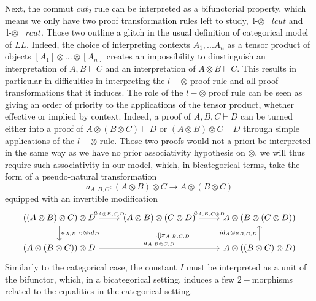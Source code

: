 \documentclass[a4paper, 12pt, twoside,openright]{report}
\begin{document}
Next, the $\text{commut } cut_2$ rule can be interpreted as a bifunctorial property, which means we only have two proof transformation rules left to study, 
$\text{l-$\otimes$ } lcut$ and $\text{l-$\otimes$ } rcut$. Those two outline a glitch in the usual definition of categorical model of $LL$. Indeed, the choice of interpreting contexts $A_1,...A_n$ as a tensor product of objects $[A_1] \otimes ... \otimes [A_n]$ creates an impossibility to dinstinguish an interpretation of $A,B \vdash C$ and an interpretation of $A \otimes B \vdash C$. This results in particular in difficulties in interpreting the $l-\otimes$ proof rule and all proof transformations that it induces. The role of the $l-\otimes$ proof rule can be seen as giving an order of priority to the applications of the tensor product, whether effective or implied by context. Indeed, a proof of $A,B,C \vdash D$ can be turned either into  a proof of $A \otimes (B \otimes C) \vdash D$ or $(A\otimes B) \otimes C \vdash D$ through simple applications of the $l-\otimes$ rule. Those two proofs would not a priori be interpreted in the same way as we have no prior associativity hypothesis on $\otimes$. we will thus require such associativity in our model, which, in bicategorical terms, take the form of a pseudo-natural transformation $$a_{A,B,C}: (A \otimes B) \otimes C \rightarrow A \otimes (B\otimes C)$$  equipped with an invertible modification $$\begin{tikzcd}
((A \otimes B) \otimes C) \otimes D
\arrow{r}{a_{A \otimes B,C,D}}
\arrow{d}{a_{A,B,C} \otimes id_D}
&
(A \otimes B) \otimes (C \otimes D)
\arrow{r}{a_{A,B,C\otimes D}}
\arrow[Rightarrow,shorten >=0.3cm,shorten <=0.3cm]{d}{\pi_{A,B,C,D}}
&
A \otimes ( B \otimes (C \otimes D))
\\
(A \otimes (B \otimes C)) \otimes D
\arrow{rr}{a_{A, B\otimes C, D}}
&{}&
A \otimes ((B \otimes C) \otimes D)
\arrow{u}{id_A \otimes a_{B,C,D}}
\end{tikzcd}$$
Similarly to the categorical case, the constant $I$ must be interpreted as a unit of the bifunctor, which, in a bicategorical setting, induces a few $2-$morphisms related to the equalities in the categorical setting.\\
\end{document}
